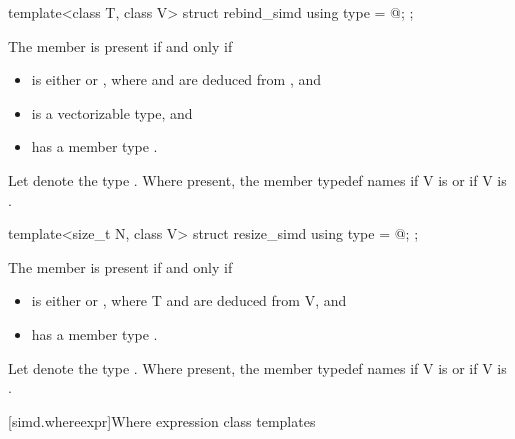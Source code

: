 \begin{itemdecl}
template<class T, class V> struct rebind_simd { using type = @\seebelow@; };
\end{itemdecl}

\begin{itemdescr}
  \pnum
  The member  is present if and only if
  \begin{itemize}
    \item {} is either  or , where  and  are deduced from , and
    \item {} is a vectorizable type, and
    \item {} has a member type .
  \end{itemize}

  \pnum
  Let  denote the type .
  Where present, the member typedef  names
   if \tcode V is  or
   if \tcode V is .
\end{itemdescr}

\begin{itemdecl}
template<size_t N, class V> struct resize_simd { using type = @\seebelow@; };
\end{itemdecl}

\begin{itemdescr}
  \pnum
  The member  is present if and only if
  \begin{itemize}
    \item {} is either  or , where \tcode T and  are deduced from \tcode V, and
    \item {} has a member type .
  \end{itemize}

  \pnum
  Let  denote the type .
  Where present, the member typedef  names  if \tcode V is  or  if \tcode V is .
\end{itemdescr}

[simd.whereexpr]{Where expression class templates}

